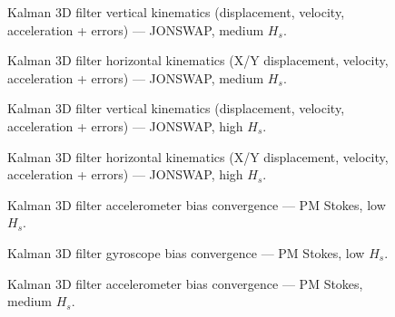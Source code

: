 \documentclass[11pt,letterpaper]{article}
\begin{document}
    \begin{figure}[H]\centering
    \resizebox{\textwidth}{!}{}
    \caption{Kalman 3D filter vertical kinematics (displacement, velocity, acceleration + errors) — JONSWAP, medium $H_s$.}
    \label{fig:w3d_ou3_jonswap_medium_zkin}
    \end{figure}

    \begin{figure}[H]\centering
    \resizebox{\textwidth}{!}{}
    \caption{Kalman 3D filter horizontal kinematics (X/Y displacement, velocity, acceleration + errors) — JONSWAP, medium $H_s$.}
    \label{fig:w3d_ou3_jonswap_medium_xykin}
    \end{figure}

    \begin{figure}[H]\centering
    \resizebox{\textwidth}{!}{}
    \caption{Kalman 3D filter vertical kinematics (displacement, velocity, acceleration + errors) — JONSWAP, high $H_s$.}
    \label{fig:w3d_ou3_jonswap_high_zkin}
    \end{figure}

    \begin{figure}[H]\centering
    \resizebox{\textwidth}{!}{}
    \caption{Kalman 3D filter horizontal kinematics (X/Y displacement, velocity, acceleration + errors) — JONSWAP, high $H_s$.}
    \label{fig:w3d_ou3_jonswap_high_xykin}
    \end{figure}


    \begin{figure}[H]\centering
    \resizebox{\textwidth}{!}{}
    \caption{Kalman 3D filter accelerometer bias convergence — PM Stokes, low $H_s$.}
    \label{fig:w3d_ou3_pmstokes_low_acc_bias}
    \end{figure}

    \begin{figure}[H]\centering
    \resizebox{\textwidth}{!}{}
    \caption{Kalman 3D filter gyroscope bias convergence — PM Stokes, low $H_s$.}
    \label{fig:w3d_ou3_pmstokes_low_gyro_bias}
    \end{figure}

    \begin{figure}[H]\centering
    \resizebox{\textwidth}{!}{}
    \caption{Kalman 3D filter accelerometer bias convergence — PM Stokes, medium $H_s$.}
    \label{fig:w3d_ou3_pmstokes_medium_acc_bias}
    \end{figure}
\end{document}

